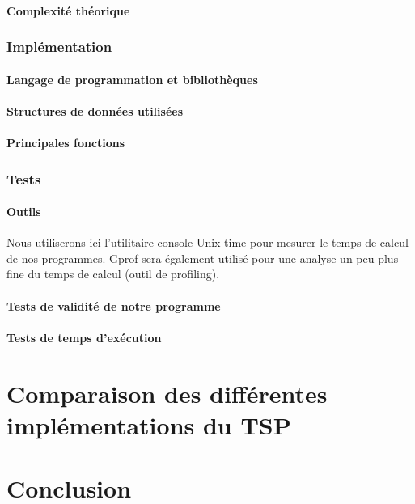 \documentclass[a4paper, 12pt]{article}
\begin{document}
\paragraph{Complexité théorique}

\subsubsection{Implémentation}

\paragraph{Langage de programmation et bibliothèques}

\paragraph{Structures de données utilisées}

\paragraph{Principales fonctions}

\subsubsection{Tests}

\paragraph{Outils}

Nous utiliserons ici l'utilitaire console Unix time pour mesurer le
temps de calcul de nos programmes. Gprof sera également utilisé pour
une analyse un peu plus fine du temps de calcul (outil de profiling).

\paragraph{Tests de validité de notre programme}

\paragraph{Tests de temps d'exécution}

\section{Comparaison des différentes implémentations du TSP}


\section{Conclusion}
\end{document}
